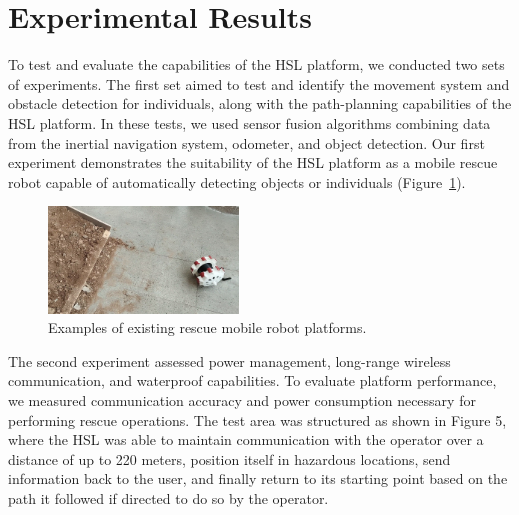 \documentclass[conference]{IEEEtran}
\begin{document}
\section{Experimental Results} 
To test and evaluate the capabilities of the HSL platform, we conducted two sets of experiments. The first set aimed to test and identify the movement system and obstacle detection for individuals, along with the path-planning capabilities of the HSL platform. In these tests, we used sensor fusion algorithms combining data from the inertial navigation system, odometer, and object detection. Our first experiment demonstrates the suitability of the HSL platform as a mobile rescue robot capable of automatically detecting objects or individuals (Figure~\ref{Fig_HSL-Throw}).

\begin{figure}[htbp] 
    \centerline{\includegraphics[width=0.45\textwidth]{HSL-Throw.png}} 
    \caption{Examples of existing rescue mobile robot platforms.} 
    \label{Fig_HSL-Throw} 
\end{figure}

The second experiment assessed power management, long-range wireless communication, and waterproof capabilities. To evaluate platform performance, we measured communication accuracy and power consumption necessary for performing rescue operations. The test area was structured as shown in Figure 5, where the HSL was able to maintain communication with the operator over a distance of up to 220 meters, position itself in hazardous locations, send information back to the user, and finally return to its starting point based on the path it followed if directed to do so by the operator.
\end{document}
